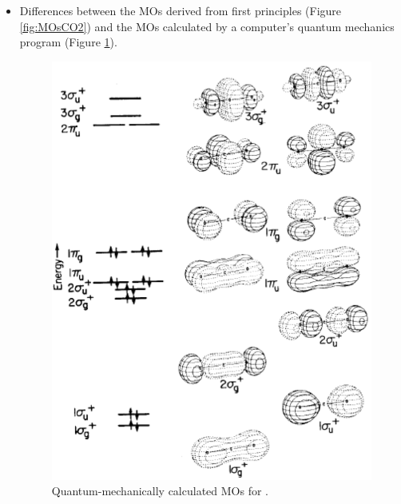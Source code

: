 \documentclass[../notes.tex]{subfiles}
\begin{document}
\begin{itemize}
\begin{enumerate}
\begin{itemize}
            \begin{itemize}
                \item However, we still know that the bonding orbital is slightly lower in energy than the antibonding orbital by counting nodes
                \item A bit of mixing also occurs, though (see the discussion surrounding Figure \ref{fig:calculatedMOsCO2}).
            \end{itemize}
            \item We have so many oxygen electrons since we have \emph{two} oxygens and we are considering their \emph{group} orbitals.
            \item We can draw SALCs intuitively by combining orbitals in a bonding or antibonding fashion, or rigorously using the projection operator.
            \item \emph{Redraw \& add electrons later!}
        \end{itemize}
        \item Done (see Figure \ref{fig:MOsCO2}).
        \item Done (see Figure \ref{fig:MOsCO2}).
    \end{enumerate}
    \item Differences between the  MOs derived from first principles (Figure \ref{fig:MOsCO2}) and the MOs calculated by a computer's quantum mechanics program (Figure \ref{fig:calculatedMOsCO2}).
    \begin{figure}[H]
        \centering
        \includegraphics[width=0.5\linewidth]{../ExtFiles/calculatedMOsCO2.png}
        \caption{Quantum-mechanically calculated MOs for .}
        \label{fig:calculatedMOsCO2}
    \end{figure}

\end{itemize}
\end{document}
